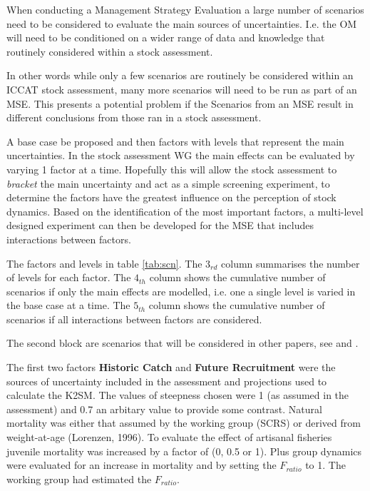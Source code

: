 \documentclass[a4paper, 10pt]{article}
\begin{document}
When conducting a Management Strategy Evaluation a large number of scenarios need to be considered to
evaluate the main sources of uncertainties. I.e. the OM will need to be 
conditioned on a wider range of data and knowledge that routinely considered within a stock assessment. 

In other words while only a few scenarios are routinely be considered within an ICCAT stock assessment, many more 
scenarios will need to be run as part of an MSE. This presents a potential problem if
the Scenarios from an MSE result in different conclusions from those ran in a stock assessment.

A base case be proposed and then factors with levels that represent the main uncertainties. In the
stock assessment WG the main effects can be evaluated by varying 1 factor at a time. Hopefully this will 
allow the stock assessment to \textit{bracket} the main uncertainty and act as a simple screening experiment, 
to determine the factors have the greatest influence on the perception of stock dynamics.
Based on the identification of the most important factors, a multi-level designed experiment can then be developed
for the MSE that includes interactions between factors.

The factors and levels in table \ref{tab:scn}. The $3_{rd}$ column summarises the 
number of levels for each factor. The $4_{th}$ column shows the cumulative number of scenarios if only the 
main effects are modelled, i.e. one a single level is varied in the base case at a time. The $5_{th}$ column 
shows the cumulative number of scenarios if all interactions between factors are considered.

The second block are scenarios that will be considered in other papers, see \cite{fromentin2006size} \cite{bftpop} and \cite{bftalk2014}.

The first two factors \textbf{Historic Catch} and \textbf{Future Recruitment} were the sources of uncertainty 
included in the assessment and projections used to calculate the K2SM.
The values of steepness chosen were 1 (as assumed in the assessment) and 0.7 an arbitary value to provide some 
contrast. Natural mortality was either that assumed by the working group (SCRS) or derived from weight-at-age
(Lorenzen, 1996). To evaluate the effect of artisanal fisheries juvenile mortality was increased by a factor of 
(0, 0.5 or 1). Plus group dynamics were evaluated for an increase in mortality and by setting the $F_{ratio}$ to 1.
The working group had estimated the $F_{ratio}$.
\end{document}

